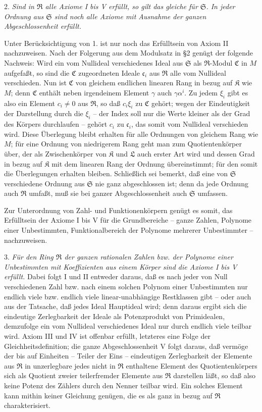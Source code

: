 \documentclass[11pt]{article}
\providecommand{\mR}{\mathfrak{R}}
\providecommand{\mK}{\mathfrak{K}}
\providecommand{\mL}{\mathfrak{L}}
\providecommand{\mS}{\mathfrak{S}}
\providecommand{\mC}{\mathfrak{C}}
\providecommand{\mc}{\mathfrak{c}}
\begin{document}
2. \emph{Sind in $\mR$ alle Axiome I bis V erfüllt, so gilt das gleiche für $\mS$. In jeder Ordnung aus $\mS$ sind noch alle Axiome mit Ausnahme der ganzen Abgeschlossenheit erfüllt.}

Unter Berücksichtigung von 1. ist nur noch das Erfülltsein von Axiom II nachzuweisen. Nach der Folgerung aus dem Modulsatz in §2 genügt der folgende Nachweis: Wird ein vom Nullideal verschiedenes Ideal aus $\mS$ als $\mR$-Modul $\mC$ in $M$ aufgefaßt, so sind die $\mC$ zugeordneten Ideale $\mc_i$ aus $\mR$ alle vom Nullideal verschieden. Nun ist $\mC$ von gleichem endlichen linearen Rang in bezug auf $\mK$ wie $M$; denn $\mC$ enthält neben irgendeinem Element $\gamma$ auch $\gamma\alpha^i$. Zu jedem $\xi_i$ gibt es also ein Element $c_i\ne0$ aus $\mR$, so daß $c_i\xi_i$ zu $\mC$ gehört; wegen der Eindeutigkeit der Darstellung durch die $\xi_i$ -- der Index soll nur die Werte kleiner als der Grad des Körpers durchlaufen -- gehört $c_i$ zu $\mc_i$, das somit vom Nullideal verschieden wird. Diese Überlegung bleibt erhalten für alle Ordnungen von gleichem Rang wie $M$; für eine Ordnung von niedrigerem Rang geht man zum Quotientenkörper über, der als Zwischenkörper von $\mK$ und $\mL$ auch erster Art wird und dessen Grad in bezug auf $\mK$ mit dem linearen Rang der Ordnung übereinstimmt; für den somit die Überlegungen erhalten bleiben. Schließlich sei bemerkt, daß eine von $\mS$ verschiedene Ordnung aus $\mS$ nie ganz abgeschlossen ist; denn da jede Ordnung auch $\mR$ umfaßt, muß sie bei ganzer Abgeschlossenheit auch $\mS$ umfassen.

Zur Unterordnung von Zahl- und Funktionenkörpern genügt es somit, das Erfülltsein der Axiome I bis V für die Grundbereiche -- ganze Zahlen, Polynome einer Unbestimmten, Funktionalbereich der Polynome mehrerer Unbestimmter -- nachzuweisen.

3. \emph{Für den Ring $\mR$ der ganzen rationalen Zahlen bzw. der Polynome einer Unbestimmten mit Koeffizienten aus einem Körper sind die Axiome I bis V erfüllt.} Dabei folgt I und II entweder daraus, daß es nach jeder von Null verschiedenen Zahl bzw. nach einem solchen Polynom einer Unbestimmten nur endlich viele bzw. endlich viele linear-unabhängige Restklassen gibt -- oder auch aus der Tatsache, daß jedes Ideal Hauptideal wird; denn daraus ergibt sich die eindeutige Zerlegbarkeit der Ideale als Potenzprodukt von Primidealen, demzufolge ein vom Nullideal verschiedenes Ideal nur durch endlich viele teilbar wird. Axiom III und IV ist offenbar erfüllt, letzteres eine Folge der Gleichheitsdefinition; die ganze Abgeschlossenheit V folgt daraus, daß vermöge der bis auf Einheiten -- Teiler der Eins -- eindeutigen Zerlegbarkeit der Elemente aus $\mR$ in unzerlegbare jedes nicht in $\mR$ enthaltene Element des Quotientenkörpers sich als Quotient zweier teilerfremder Elemente aus $\mR$ darstellen läßt, so daß also keine Potenz des Zählers durch den Nenner teilbar wird. Ein solches Element kann mithin keiner Gleichung genügen, die es als ganz in bezug auf $\mR$ charakterisiert.
\end{document}
